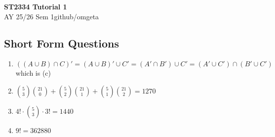 \documentclass[12pt, a4paper]{article}
\newcommand{\mytitle}{ST2334 Tutorial 1}
\newcommand{\myauthor}{github/omgeta}
\newcommand{\mydate}{AY 25/26 Sem 1}
\begin{document}
\raggedright
\footnotesize
\begin{center}
{\normalsize{\textbf{\mytitle}}} \\
{\footnotesize{\mydate\hspace{2pt}\textemdash\hspace{2pt}\myauthor}}
\end{center}
\subsection*{Short Form Questions}
\begin{enumerate}[Q\arabic*.]
  \item $((A \cup B)\cap C)' = (A \cup B)' \cup C' = (A' \cap B') \cup C' = (A' \cup C') \cap (B' \cup C')$ which is (c)

  \item $\displaystyle\binom 53 \binom {21}0 + \binom 52 \binom{21}{1} + \binom 51 \binom{21}2 = 1270$

  \item $4! \cdot \displaystyle\binom 53 \cdot 3! = 1440$

  \item $9! = 362880$
\end{enumerate}
\end{document}
